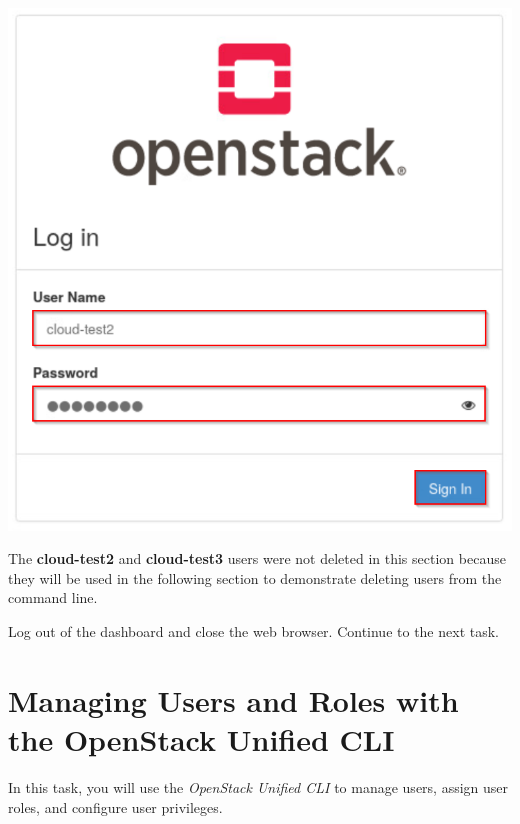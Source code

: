 \documentclass[letterpaper, 12pt]{article}
\begin{document}
\begin{enumerate}
\begin{labstep}
        \begin{center}
            \includegraphics[scale=0.5]{images/part3/step18.png}
        \end{center}
    \end{labstep}

    \begin{notebox}
        The \textbf{cloud-test2} and \textbf{cloud-test3} users were not deleted in this section because they will be used in the following section to demonstrate deleting users from the command line.
    \end{notebox}

    \begin{labstep}
        Log out of the dashboard and close the web browser.
        Continue to the next task.
    \end{labstep}
\end{enumerate}

\section{Managing Users and Roles with the OpenStack Unified CLI}\label{sec:managing_users_using_the_openstack_unified_cli}
In this task, you will use the \textit{OpenStack Unified CLI} to manage users, assign user roles, and configure user privileges.
\end{document}

